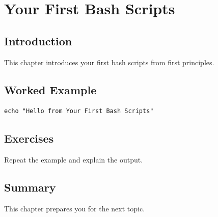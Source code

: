 \chapter{Your First Bash Scripts}
\label{chap:35}
\section{Introduction}
This chapter introduces your first bash scripts from first principles.

\section{Worked Example}
\begin{lstlisting}
echo "Hello from Your First Bash Scripts"
\end{lstlisting}

\section{Exercises}
\begin{exercise}
Repeat the example and explain the output.
\end{exercise}

\section{Summary}
This chapter prepares you for the next topic.
